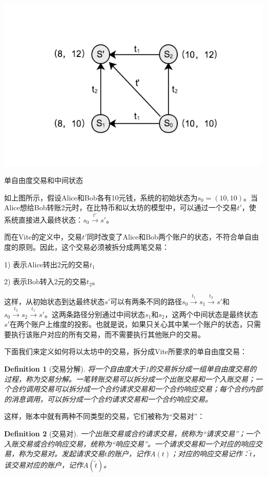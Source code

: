 \documentclass[UTF8,nofonts]{ctexart}
\makeatletter
\newtheorem{definition}{Definition}[section]
\newenvironment{figurehere}
 {\def\@captype{figure}}
 {}
\makeatother
\begin{document}
\begin{multicols}{2}
\begin{center}
\begin{figurehere}
\includegraphics[width=.8\linewidth]{image/tx-deg-of-free.png}
\caption{单自由度交易和中间状态}
\end{figurehere}
\end{center}

如上图所示，假设Alice和Bob各有10元钱，系统的初始状态为$s_{0} = (10, 10)$。当Alice想给Bob转账2元时，在比特币和以太坊的模型中，可以通过一个交易${t}'$，使系统直接进入最终状态：$s_{0} \overset{{t}'}{\rightarrow}{s}'$。

而在Vite的定义中，交易${t}'$同时改变了Alice和Bob两个账户的状态，不符合单自由度的原则。因此，这个交易必须被拆分成两笔交易：

1) 表示Alice转出2元的交易$t_{1}$

2) 表示Bob转入2元的交易$t_{2}$。

这样，从初始状态到达最终状态${s}'$可以有两条不同的路径$s_{0} \overset{t_{1}}{\rightarrow} s_{1} \overset{t_{2}}{\rightarrow} {s}'$和$s_{0} \overset{t_{2}}{\rightarrow} s_{2} \overset{t_{1}}{\rightarrow} {s}'$。这两条路径分别通过中间状态$s_{1}$和$s_{2}$，这两个中间状态是最终状态${s}'$在两个账户上维度的投影。也就是说，如果只关心其中某一个账户的状态，只需要执行该账户对应的所有交易，而不需要执行其他账户的交易。

下面我们来定义如何将以太坊中的交易，拆分成Vite所要求的单自由度交易：
\begin{definition}[交易分解]
将一个自由度大于1的交易拆分成一组单自由度交易的过程，称为交易分解。一笔转账交易可以拆分成一个出账交易和一个入账交易；一个合约调用交易可以拆分成一个合约请求交易和一个合约响应交易；每个合约内部的消息调用，可以拆分成一个合约请求交易和一个合约响应交易。
\end{definition}

这样，账本中就有两种不同类型的交易，它们被称为“交易对”：
\begin{definition}[交易对]
一个出账交易或合约请求交易，统称为“请求交易”；一个入账交易或合约响应交易，统称为“响应交易”。一个请求交易和一个对应的响应交易，称为交易对。发起请求交易$t$的账户，记作$A(t)$；对应的响应交易记作：$\widetilde{t}$，该交易对应的账户，记作$A(\widetilde{t})$。
\end{definition}


\end{multicols}
\end{document}
